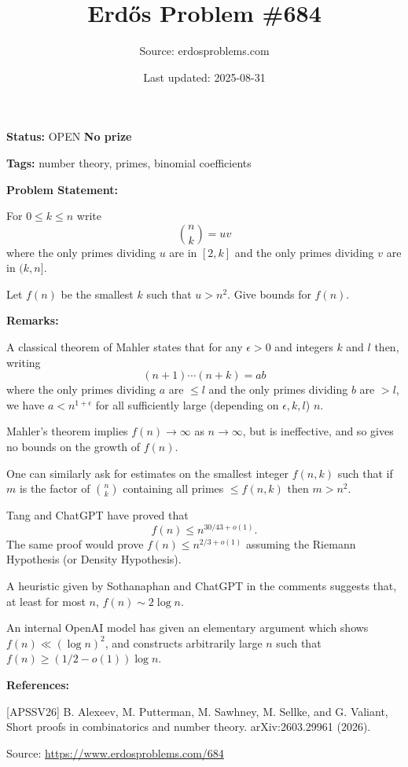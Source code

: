 \documentclass{article}
\title{Erd\H{o}s Problem \#684}
\date{Last updated: 2025-08-31}
\author{Source: erdosproblems.com}
\begin{document}
\maketitle

\noindent\textbf{Status:} OPEN \quad \textbf{No prize}

\noindent\textbf{Tags:} number theory, primes, binomial coefficients

\medskip
\noindent\textbf{Problem Statement:}

For $0\leq k\leq n$ write\[\binom{n}{k} = uv\]where the only primes dividing $u$ are in $[2,k]$ and the only primes dividing $v$ are in $(k,n]$. 

Let $f(n)$ be the smallest $k$ such that $u>n^2$. Give bounds for $f(n)$.

\bigskip
\noindent\textbf{Remarks:}

A classical theorem of Mahler states that for any $\epsilon>0$ and integers $k$ and $l$ then, writing\[(n+1)\cdots (n+k) = ab\]where the only primes dividing $a$ are $\leq l$ and the only primes dividing $b$ are $>l$, we have $a < n^{1+\epsilon}$ for all sufficiently large (depending on $\epsilon,k,l$) $n$.

Mahler's theorem implies $f(n)\to \infty$ as $n\to \infty$, but is ineffective, and so gives no bounds on the growth of $f(n)$.

One can similarly ask for estimates on the smallest integer $f(n,k)$ such that if $m$ is the factor of $\binom{n}{k}$ containing all primes $\leq f(n,k)$ then $m > n^2$.

Tang and ChatGPT have proved that\[f(n)\leq n^{30/43+o(1)}.\]The same proof would prove $f(n) \leq n^{2/3+o(1)}$ assuming the Riemann Hypothesis (or Density Hypothesis). 

A heuristic given by Sothanaphan and ChatGPT in the comments suggests that, at least for most $n$, $f(n)\sim 2\log n$.

An internal OpenAI model \cite{APSSV26} has given an elementary argument which shows $f(n) \ll (\log n)^2$, and constructs arbitrarily large $n$ such that $f(n)\geq (1/2-o(1))\log n$.

\bigskip
\noindent\textbf{References:}

[APSSV26] B. Alexeev, M. Putterman, M. Sawhney, M. Sellke, and G. Valiant, Short proofs in combinatorics and number theory. arXiv:2603.29961 (2026).

\bigskip
\noindent\small{Source: \url{https://www.erdosproblems.com/684}}
\end{document}
